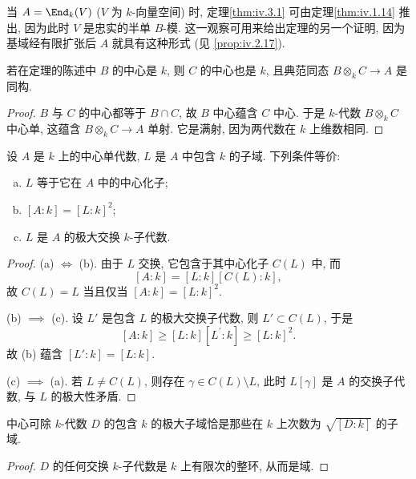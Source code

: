 \begin{remark}\label{rem:iv.3.2}
当 $A=\End_k(V)$ ($V$ 为 $k$-向量空间) 时, 定理\ref{thm:iv.3.1} 可由定理\ref{thm:iv.1.14} 推出, 因为此时 $V$ 是忠实的半单 $B$-模. 这一观察可用来给出定理的另一个证明, 因为基域经有限扩张后 $A$ 就具有这种形式 (见 \ref{prop:iv.2.17}).
\end{remark}

\begin{corollary}\label{cor:iv.3.3}
若在定理的陈述中 $B$ 的中心是 $k$, 则 $C$ 的中心也是 $k$, 且典范同态 $B\otimes_k C\to A$ 是同构.
\end{corollary}

\begin{proof}
$B$ 与 $C$ 的中心都等于 $B\cap C$, 故 $B$ 中心蕴含 $C$ 中心. 于是 $k$-代数 $B\otimes_k C$ 中心单, 这蕴含 $B\otimes_k C\to A$ 单射. 它是满射, 因为两代数在 $k$ 上维数相同.
\end{proof}

\begin{corollary}\label{cor:iv.3.4}
设 $A$ 是 $k$ 上的中心单代数, $L$ 是 $A$ 中包含 $k$ 的子域. 下列条件等价:

\begin{enumerate}[(a)]
\item $L$ 等于它在 $A$ 中的中心化子;
\item $[A:k]=[L:k]^2$;
\item $L$ 是 $A$ 的极大交换 $k$-子代数.
\end{enumerate}
\end{corollary}

\begin{proof}
(a) $\iff$ (b). 由于 $L$ 交换, 它包含于其中心化子 $C(L)$ 中, 而
\[
[A:k]=[L:k][C(L):k],
\]
故 $C(L)=L$ 当且仅当 $[A:k]=[L:k]^2$.

(b) $\implies$ (c). 设 $L'$ 是包含 $L$ 的极大交换子代数, 则 $L'\subset C(L)$, 于是
\[
[A:k]\ge[L:k][L^{\prime}:k]\ge[L:k]^{2}.
\]
故 (b) 蕴含 $[L':k]=[L:k]$.

(c) $\implies$ (a). 若 $L\neq C(L)$, 则存在 $\gamma\in C(L)\setminus L$, 此时 $L[\gamma]$ 是 $A$ 的交换子代数, 与 $L$ 的极大性矛盾.
\end{proof}

\begin{corollary}\label{cor:iv.3.5}
中心可除 $k$-代数 $D$ 的包含 $k$ 的极大子域恰是那些在 $k$ 上次数为 $\sqrt{[D:k]}$ 的子域.
\end{corollary}

\begin{proof}
$D$ 的任何交换 $k$-子代数是 $k$ 上有限次的整环, 从而是域.
\end{proof}

